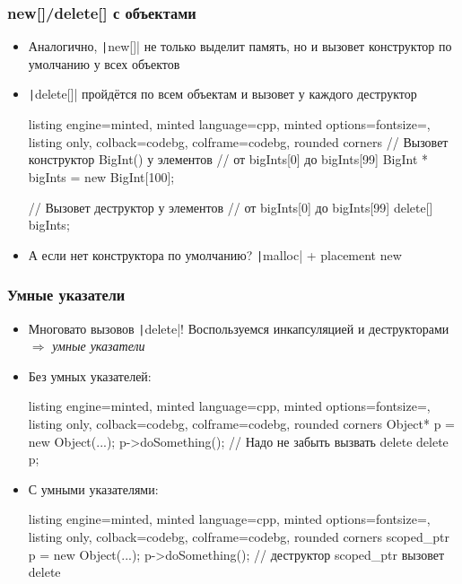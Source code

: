 \documentclass[10pt]{beamer}
\begin{document}
\begin{frame}[fragile]
\frametitle{new[]/delete[] с объектами}
\begin{itemize}
\item Аналогично, \texttt|new[]| не только выделит память, но и вызовет конструктор по умолчанию у всех объектов
\pause
\item \texttt|delete[]| пройдётся по всем объектам и вызовет у каждого деструктор
\pause
{}
\begin{tcblisting}{listing engine=minted, minted language=cpp, minted options={fontsize=\scriptsize}, listing only, colback=codebg, colframe=codebg, rounded corners}
// Вызовет конструктор BigInt() у элементов
// от bigInts[0] до bigInts[99]
BigInt * bigInts = new BigInt[100];

// Вызовет деструктор у элементов
// от bigInts[0] до bigInts[99]
delete[] bigInts;
\end{tcblisting}
\pause
{}
\item А если нет конструктора по умолчанию? \pause \texttt|malloc| + placement new
\end{itemize}
\end{frame}

\begin{frame}[fragile]
\frametitle{Умные указатели}
\begin{itemize}
\item Многовато вызовов \texttt|delete|! Воспользуемся инкапсуляцией и деструкторами \(\Longrightarrow\) \textit{умные указатели}
\pause
\item Без умных указателей:
\begin{tcblisting}{listing engine=minted, minted language=cpp, minted options={fontsize=\scriptsize}, listing only, colback=codebg, colframe=codebg, rounded corners}
Object* p = new Object(...);
p->doSomething();
// Надо не забыть вызвать delete
delete p;
\end{tcblisting}
\pause
\item С умными указателями:
\begin{tcblisting}{listing engine=minted, minted language=cpp, minted options={fontsize=\scriptsize}, listing only, colback=codebg, colframe=codebg, rounded corners}
scoped_ptr p = new Object(...);
p->doSomething();
// деструктор scoped_ptr вызовет delete
\end{tcblisting}
\end{itemize}
\end{frame}
\end{document}
